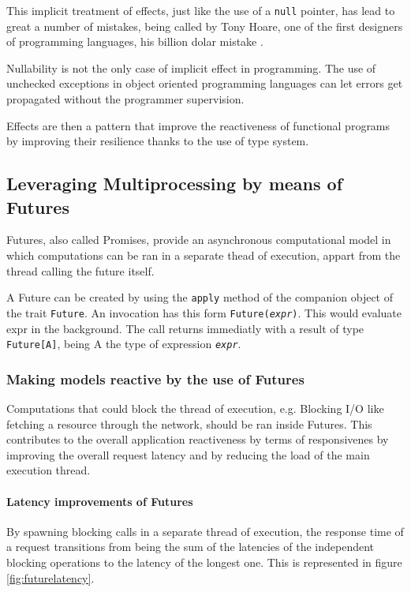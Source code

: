 \documentclass[../main.tex]{subfiles}
\begin{document}
This implicit treatment of effects, just like the use of a \texttt{null} pointer, has
lead to great a number of mistakes, being called by Tony Hoare, one of the first designers of
programming languages, his billion dolar mistake \autocite{NullMistake}.

Nullability is not the only case of implicit effect in programming. The use of unchecked
exceptions in object oriented programming languages can let errors get propagated
without the programmer supervision.

Effects are then a pattern that improve the reactiveness of functional programs by
improving their resilience thanks to the use of type system.

\subsection{Leveraging Multiprocessing by means of Futures}
Futures, also called Promises, provide an asynchronous computational model in
which computations can be ran in a separate thead of execution, appart from the
thread calling the future itself.

A Future can be created by using the \texttt{apply} method of the companion object
of the trait \texttt{Future}. An invocation has this form
\texttt{Future(\textit{expr})}. This would evaluate expr in the background. The
call returns immediatly with a result of type \texttt{Future[A]}, being A the type
of expression \texttt{\textit{expr}}.

\subsubsection{Making models reactive by the use of Futures}

Computations that could block the thread of execution, e.g. Blocking I/O like
fetching a resource through the network, should be ran inside Futures. This
contributes to the overall application reactiveness by terms of responsivenes by
improving the overall request latency and by reducing the load of the main
execution thread.

\paragraph{Latency improvements of Futures}

By spawning blocking calls in a separate thread of execution, the response time of
a request transitions from being the sum of the latencies of the independent
blocking operations to the latency of the longest one. This is represented in
figure \ref{fig:futurelatency}.
\end{document}
